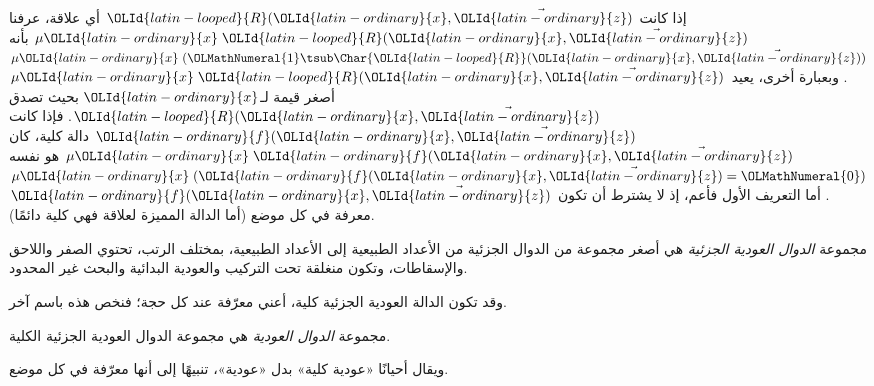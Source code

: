 \documentclass[../../../include/open-logic-section]{subfiles}
\begin{document}
إذا كانت $\OLId{latin-looped}{R}(\OLId{latin-ordinary}{x},\vec \OLId{latin-ordinary}{z})$ أي علاقة، عرفنا $\mu \OLId{latin-ordinary}{x}\;\OLId{latin-looped}{R}(\OLId{latin-ordinary}{x},\vec \OLId{latin-ordinary}{z})$ بأنه
$\mu \OLId{latin-ordinary}{x}\;(\OLMathNumeral{1}\tsub\Char{\OLId{latin-looped}{R}}(\OLId{latin-ordinary}{x},\vec \OLId{latin-ordinary}{z}))$. وبعبارة أخرى، يعيد
$\mu \OLId{latin-ordinary}{x}\;\OLId{latin-looped}{R}(\OLId{latin-ordinary}{x},\vec \OLId{latin-ordinary}{z})$ أصغر قيمة لـ$\OLId{latin-ordinary}{x}$ بحيث تصدق $\OLId{latin-looped}{R}(\OLId{latin-ordinary}{x},\vec \OLId{latin-ordinary}{z})$.
فإذا كانت $\OLId{latin-ordinary}{f}(\OLId{latin-ordinary}{x},\vec \OLId{latin-ordinary}{z})$ دالة كلية، كان $\mu \OLId{latin-ordinary}{x}\;\OLId{latin-ordinary}{f}(\OLId{latin-ordinary}{x},\vec \OLId{latin-ordinary}{z})$ هو نفسه
$\mu \OLId{latin-ordinary}{x}\;(\OLId{latin-ordinary}{f}(\OLId{latin-ordinary}{x},\vec \OLId{latin-ordinary}{z})=\OLMathNumeral{0})$. أما التعريف الأول فأعم، إذ لا يشترط
أن تكون $\OLId{latin-ordinary}{f}(\OLId{latin-ordinary}{x},\vec \OLId{latin-ordinary}{z})$ معرفة في كل موضع (أما الدالة المميزة
لعلاقة فهي كلية دائمًا).

\begin{defn}
مجموعة \emph{الدوال العودية الجزئية} هي أصغر مجموعة من الدوال الجزئية
من الأعداد الطبيعية إلى الأعداد الطبيعية، بمختلف الرتب، تحتوي الصفر
واللاحق والإسقاطات، وتكون منغلقة تحت التركيب والعودية البدائية والبحث
غير المحدود.
\end{defn}

وقد تكون الدالة العودية الجزئية كلية، أعني معرّفة عند كل
حجة؛ فنخص هذه باسم آخر.

\begin{defn}
مجموعة \emph{الدوال العودية} هي مجموعة الدوال العودية الجزئية الكلية.
\end{defn}

ويقال أحيانًا «عودية كلية» بدل «عودية»، تنبيهًا إلى أنها معرّفة في كل
موضع.
\end{document}
